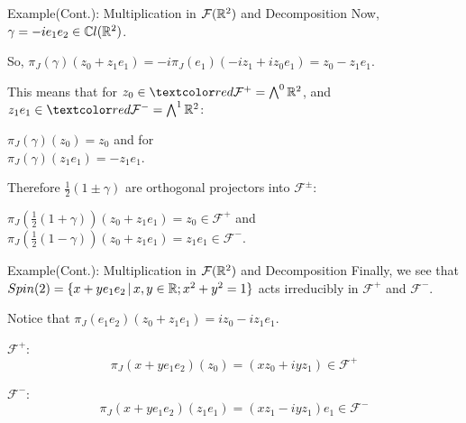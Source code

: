 \begin{frame}{Example(Cont.): Multiplication in $\mathcal F(\mathbb R^2)$ and Decomposition} %
    Now, $\gamma = -i e_1 e_2 \in \mathbb C l(\mathbb R^2)$.
    
    So, $\pi_J(\gamma) (z_0 + z_1 e_1) = -i \pi_J(e_1)(-iz_1 + iz_0e_1) = z_0 - z_1 e_1$.
    
   This means that for $z_0 \in \rtext{\mathcal F ^+ = \bigwedge^0 \RR^2}$, and $z_1 e_1 \in \rtext{\mathcal F ^- = \bigwedge^1 \RR^2}$:
    
    $\pi_J(\gamma)(z_0) = z_0$ \quad and for \\
    $\pi_J(\gamma)(z_1 e_1) = -z_1 e_1$.
    
    Therefore $\frac{1}{2}(1 \pm \gamma)$ are orthogonal projectors into $\mathcal F^\pm$:
    
    $\pi_J(\frac{1}{2}(1+\gamma))(z_0 + z_1e_1) = z_0 \in \mathcal F^+$ \quad and\\
    $\pi_J(\frac{1}{2}(1-\gamma))(z_0 + z_1e_1) = z_1 e_1 \in \mathcal F^-$.

\end{frame}

\begin{frame}{Example(Cont.): Multiplication in $\mathcal F(\mathbb R^2)$ and Decomposition} %
    Finally, we see that $Spin(2) = \{x + y e_1 e_2 \,|\, x, y \in \mathbb R; x^2 + y^2 = 1\}$ acts irreducibly in $\mathcal F^+$ and $\mathcal F^-$.
    
    Notice that $\pi_J(e_1 e_2)(z_0 + z_1 e_1) = iz_0 -iz_1 e_1$.
    
    $\mathcal F^+$:
        \[ \pi_J(x + y e_1 e_2)(z_0) = (xz_0 + iyz_1) \in \mathcal F^+\]
        
    $\mathcal F^-$:
        \[ \pi_J(x + y e_1 e_2)(z_1e_1) = (xz_1 - iyz_1)e_1 \in \mathcal F^-\]

\end{frame}

